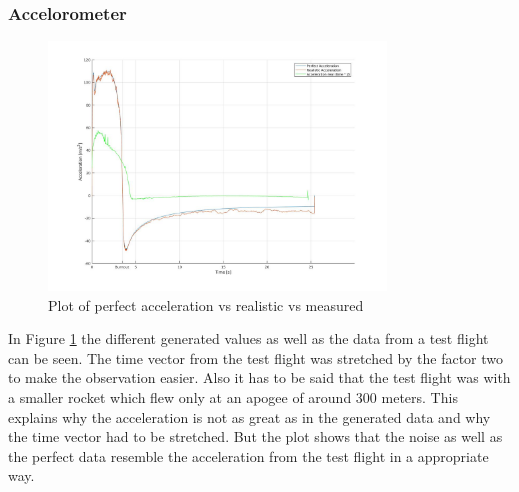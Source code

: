 \subsubsection{Accelorometer}
\begin{figure}[h!]
 \centering
 \includegraphics[width=0.8\textwidth]{./Pictures/AccelPerfVSReal.jpg}
 \caption{Plot of perfect acceleration vs realistic vs measured}
 \label{fig:AccelPerfVsReal}
\end{figure}
In Figure \ref{fig:AccelPerfVsReal} the different generated values as well as the data from a test flight can be seen.
The time vector from the test flight was stretched by the factor two to make the observation easier.
Also it has to be said that the test flight was with a smaller rocket which flew only at an apogee of around 300 meters.
This explains why the acceleration is not as great as in the generated data and why the time vector had to be stretched.
But the plot shows that the noise as well as the perfect data resemble the acceleration from the test flight in a appropriate way.

\newpage
